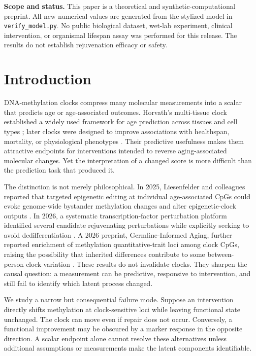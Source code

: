 \documentclass[10pt,a4paper]{article}
\begin{document}
\begin{caveatbox}
\textbf{Scope and status.} This paper is a theoretical and synthetic-computational preprint. All new numerical values are generated from the stylized model in \texttt{verify\_model.py}. No public biological dataset, wet-lab experiment, clinical intervention, or organismal lifespan assay was performed for this release. The results do not establish rejuvenation efficacy or safety.
\end{caveatbox}

\clearpage
\tableofcontents
\clearpage

\section{Introduction}
DNA-methylation clocks compress many molecular measurements into a scalar that predicts age or age-associated outcomes. Horvath's multi-tissue clock established a widely used framework for age prediction across tissues and cell types \citep{horvath2013}; later clocks were designed to improve associations with healthspan, mortality, or physiological phenotypes \citep{levine2018,lu2019}. Their predictive usefulness makes them attractive endpoints for interventions intended to reverse aging-associated molecular changes. Yet the interpretation of a changed score is more difficult than the prediction task that produced it.

The distinction is not merely philosophical. In 2025, Liesenfelder and colleagues reported that targeted epigenetic editing at individual age-associated CpGs could evoke genome-wide bystander methylation changes and alter epigenetic-clock outputs \citep{liesenfelder2025}. In 2026, a systematic transcription-factor perturbation platform identified several candidate rejuvenating perturbations while explicitly seeking to avoid dedifferentiation \citep{sengstack2026}. A 2026 preprint, Germline-Informed Aging, further reported enrichment of methylation quantitative-trait loci among clock CpGs, raising the possibility that inherited differences contribute to some between-person clock variation \citep{lim2026}. These results do not invalidate clocks. They sharpen the causal question: a measurement can be predictive, responsive to intervention, and still fail to identify which latent process changed.

We study a narrow but consequential failure mode. Suppose an intervention directly shifts methylation at clock-sensitive loci while leaving functional state unchanged. The clock can move even if repair does not occur. Conversely, a functional improvement may be obscured by a marker response in the opposite direction. A scalar endpoint alone cannot resolve these alternatives unless additional assumptions or measurements make the latent components identifiable.
\end{document}
